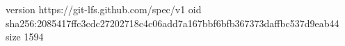 version https://git-lfs.github.com/spec/v1
oid sha256:2085417ffc3cdc27202718c4c06add7a167bbf6bfb367373daffbc537d9eab44
size 1594
